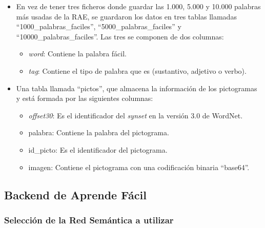 \begin{itemize}
	\item En vez de tener tres ficheros donde guardar las 1.000, 5.000 y 10.000 palabras más usadas de la RAE, se guardaron los datos en tres tablas llamadas ``1000\_palabras\_faciles'', ``5000\_palabras\_faciles'' y ``10000\_palabras\_faciles''. Las tres se componen de dos columnas:
	\begin{itemize}
		\item \textit{word}: Contiene la palabra fácil.  
		\item \textit{tag}: Contiene el tipo de palabra que es (sustantivo, adjetivo o verbo).
	\end{itemize} 
	 
	 
	\item Una tabla llamada ``pictos'', que almacena la información de los pictogramas y está formada por las siguientes columnas:
	\begin{itemize}
		\item \textit{offset30}: Es el identificador del \textit{synset} en la versión 3.0 de WordNet.
		\item palabra: Contiene la palabra del pictograma.
		\item id\_picto: Es el identificador del pictograma.
		\item imagen: Contiene el pictograma con una codificación binaria ``base64''.
	\end{itemize}

\end{itemize}


\subsection{Backend de Aprende Fácil}

\subsubsection{Selección de la Red Semántica a utilizar}
\label{cap:subsec:redsemanticautilizada}

